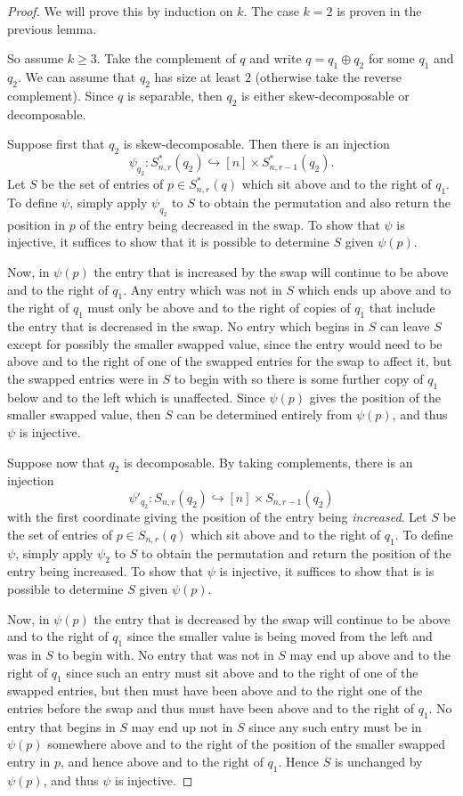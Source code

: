 \documentclass[11pt, final]{amsart}
\theoremstyle{remark}
\numberwithin{equation}{section}
\begin{document}
\begin{proof}
    We will prove this by induction on $k$. The case $k=2$ is proven in the previous lemma. 
    
    So assume $k \geq 3$. Take the complement of $q$ and write $q = q_1 \oplus q_2$ for some $q_1$ and $q_2$. We can assume that $q_2$ has size at least $2$ (otherwise take the reverse complement). Since $q$ is separable, then $q_2$ is either skew-decomposable or decomposable.

    Suppose first that $q_2$ is skew-decomposable. Then there is an injection 
    \[
    \psi_{q_2}: S_{n,r}^*(q_2) \hookrightarrow [n] \times S^*_{n, r-1}(q_2).
    \]
    Let $S$ be the set of entries of $p\in S^*_{n,r}(q)$ which sit above and to the right of $q_1$. To define $\psi$, simply apply $\psi_{q_2}$ to $S$ to obtain the permutation and also return the position in $p$ of the entry being decreased in the swap. To show that $\psi$ is injective, it suffices to show that it is possible to determine $S$ given $\psi(p)$. 
    
    Now, in $\psi(p)$ the entry that is increased by the swap will continue to be above and to the right of $q_1$. Any entry which was not in $S$ which ends up above and to the right of $q_1$ must only be above and to the right of copies of $q_1$ that include the entry that is decreased in the swap. No entry which begins in $S$ can leave $S$ except for possibly the smaller swapped value, since the entry would need to be above and to the right of one of the swapped entries for the swap to affect it, but the swapped entries were in $S$ to begin with so there is some further copy of $q_1$ below and to the left which is unaffected. Since $\psi(p)$ gives the position of the smaller swapped value, then $S$ can be determined entirely from $\psi(p)$, and thus $\psi$ is injective.

    Suppose now that $q_2$ is decomposable. By taking complements, there is an injection
    \[
    \psi'_{q_2}: S_{n,r}(q_2) \hookrightarrow [n] \times S_{n, r-1}(q_2)
    \]
    with the first coordinate giving the position of the entry being \textit{increased}. Let $S$ be the set of entries of $p\in S_{n,r}(q)$ which sit above and to the right of $q_1$. To define $\psi$, simply apply $\psi_2$ to $S$ to obtain the permutation and return the position of the entry being increased. To show that $\psi$ is injective, it suffices to show that is is possible to determine $S$ given $\psi(p)$. 
    
    Now, in $\psi(p)$ the entry that is decreased by the swap will continue to be above and to the right of $q_1$ since the smaller value is being moved from the left and was in $S$ to begin with. No entry that was not in $S$ may end up above and to the right of $q_1$ since such an entry must sit above and to the right of one of the swapped entries, but then must have been above and to the right one of the entries before the swap and thus must have been above and to the right of $q_1$. No entry that begins in $S$ may end up not in $S$ since any such entry must be in $\psi(p)$ somewhere above and to the right of the position of the smaller swapped entry in $p$, and hence above and to the right of $q_1$. Hence $S$ is unchanged by $\psi(p)$, and thus $\psi$ is injective.
\end{proof}
\end{document}
